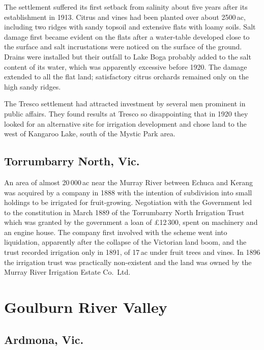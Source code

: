 The settlement suffered its first setback from salinity about five
years after its establishment in 1913.  Citrus and vines had been
planted over about 2500\,ac, including two ridges with sandy topsoil
and extensive flats with loamy soils.  Salt damage first became
evident on the flats after a water-table developed close to the
surface and salt incrustations were noticed on the surface of the
ground.  Drains were installed but their outfall to Lake Boga probably
added to the salt content of its water, which was apparently excessive
before 1920. The damage extended to all the flat land; satisfactory
citrus orchards remained only on the high sandy
ridges.

The Tresco settlement had attracted investment by several men
prominent in public affairs.  They found results at Tresco so
disappointing that in 1920 they looked for an alternative site for
irrigation development and chose land to the west of Kangaroo Lake,
south of the Mystic Park area.

\subsection*{Torrumbarry North, Vic.}

An area of almost 20\,000\,ac near the Murray River between Echuca and
Kerang was acquired by a company in 1888 with the intention of
subdivision into small holdings to be irrigated for
fruit-growing.  Negotiation with the Government led to
the constitution in March 1889 of the Torrumbarry North Irrigation
Trust which was granted by the government a loan of
\pounds12\,300, spent on machinery and an engine house.  The company
first involved with the scheme went into liquidation, apparently after
the collapse of the Victorian land boom, and the trust recorded
irrigation only in 1891, of 17\,ac under fruit trees and vines.  In
1896 the irrigation trust was practically non-existent and the land
was owned by the Murray River Irrigation Estate Co.\ Ltd.

\section*{Goulburn River Valley}

\subsection*{Ardmona, Vic.}

